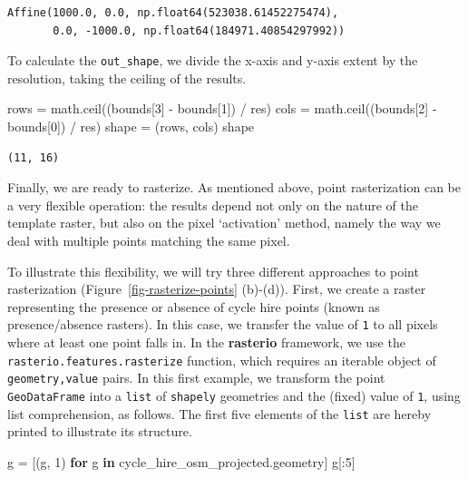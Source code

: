 \documentclass[
  letterpaper,
]{krantz}
\newenvironment{Shaded}{\begin{snugshade}}{\end{snugshade}}
\newcommand{\ControlFlowTok}[1]{\textcolor[rgb]{0.00,0.23,0.31}{\textbf{#1}}}
\newcommand{\DecValTok}[1]{\textcolor[rgb]{0.68,0.00,0.00}{#1}}
\newcommand{\KeywordTok}[1]{\textcolor[rgb]{0.00,0.23,0.31}{\textbf{#1}}}
\newcommand{\NormalTok}[1]{\textcolor[rgb]{0.00,0.23,0.31}{#1}}
\newcommand{\OperatorTok}[1]{\textcolor[rgb]{0.37,0.37,0.37}{#1}}
\begin{document}
\begin{verbatim}
Affine(1000.0, 0.0, np.float64(523038.61452275474),
       0.0, -1000.0, np.float64(184971.40854297992))
\end{verbatim}

To calculate the \texttt{out\_shape}, we divide the x-axis and y-axis
extent by the resolution, taking the ceiling of the results.

\begin{Shaded}
\begin{Highlighting}[]
\NormalTok{rows }\OperatorTok{=}\NormalTok{ math.ceil((bounds[}\DecValTok{3}\NormalTok{] }\OperatorTok{{-}}\NormalTok{ bounds[}\DecValTok{1}\NormalTok{]) }\OperatorTok{/}\NormalTok{ res)}
\NormalTok{cols }\OperatorTok{=}\NormalTok{ math.ceil((bounds[}\DecValTok{2}\NormalTok{] }\OperatorTok{{-}}\NormalTok{ bounds[}\DecValTok{0}\NormalTok{]) }\OperatorTok{/}\NormalTok{ res)}
\NormalTok{shape }\OperatorTok{=}\NormalTok{ (rows, cols)}
\NormalTok{shape}
\end{Highlighting}
\end{Shaded}

\begin{verbatim}
(11, 16)
\end{verbatim}

Finally, we are ready to rasterize. As mentioned above, point
rasterization can be a very flexible operation: the results depend not
only on the nature of the template raster, but also on the pixel
`activation' method, namely the way we deal with multiple points
matching the same pixel.

To illustrate this flexibility, we will try three different approaches
to point rasterization (Figure~\ref{fig-rasterize-points} (b)-(d)).
First, we create a raster representing the presence or absence of cycle
hire points (known as presence/absence rasters). In this case, we
transfer the value of \texttt{1} to all pixels where at least one point
falls in. In the \textbf{rasterio} framework, we use the
\texttt{rasterio.features.rasterize} function, which requires an
iterable object of \texttt{geometry,value} pairs. In this first example,
we transform the point \texttt{GeoDataFrame} into a \texttt{list} of
\texttt{shapely} geometries and the (fixed) value of \texttt{1}, using
list comprehension, as follows. The first five elements of the
\texttt{list} are hereby printed to illustrate its structure.

\begin{Shaded}
\begin{Highlighting}[]
\NormalTok{g }\OperatorTok{=}\NormalTok{ [(g, }\DecValTok{1}\NormalTok{) }\ControlFlowTok{for}\NormalTok{ g }\KeywordTok{in}\NormalTok{ cycle\_hire\_osm\_projected.geometry]}
\NormalTok{g[:}\DecValTok{5}\NormalTok{]}
\end{Highlighting}
\end{Shaded}
\end{document}
